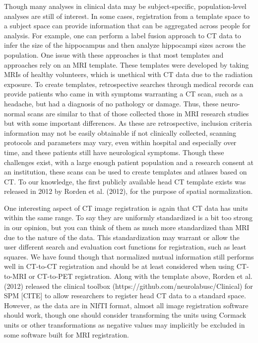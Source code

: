 \documentclass[]{elsarticle} %
\begin{document}
Though many analyses in clinical data may be subject-specific,
population-level analyses are still of interest. In some cases,
registration from a template space to a subject space can provide
information that can be aggregated across people for analysis. For
example, one can perform a label fusion approach to CT data to infer the
size of the hippocampus and then analyze hippocampi sizes across the
population. One issue with these approaches is that most templates and
approaches rely on an MRI template. These templates were developed by
taking MRIs of healthy volunteers, which is unethical with CT data due
to the radiation exposure. To create templates, retrospective searches
through medical records can provide patients who came in with symptoms
warranting a CT scan, such as a headache, but had a diagnosis of no
pathology or damage. Thus, these neuro-normal scans are similar to that
of those collected those in MRI research studies but with some important
differences. As these are retrospective, inclusion criteria information
may not be easily obtainable if not clinically collected, scanning
protocols and parameters may vary, even within hospital and especially
over time, and these patients still have neurological symptoms. Though
these challenges exist, with a large enough patient population and a
research consent at an institution, these scans can be used to create
templates and atlases based on CT. To our knowledge, the first publicly
available head CT template exists was released in 2012 by Rorden et al.
(2012), for the purpose of spatial normalization.

One interesting aspect of CT image registration is again that CT data
has units within the same range. To say they are uniformly standardized
is a bit too strong in our opinion, but you can think of them as much
more standardized than MRI due to the nature of the data. This
standardization may warrant or allow the user different search and
evaluation cost functions for registration, such as least squares. We
have found though that normalized mutual information still performs well
in CT-to-CT registration and should be at least considered when using
CT-to-MRI or CT-to-PET registration. Along with the template above,
Rorden et al. (2012) released the clinical toolbox
(https://github.com/neurolabusc/Clinical) for SPM {[}CITE{]} to allow
researchers to register head CT data to a standard space. However, as
the data are in NIfTI format, almost all image registration software
should work, though one should consider transforming the units using
Cormack units or other transformations as negative values may implicitly
be excluded in some software built for MRI registration.
\end{document}
